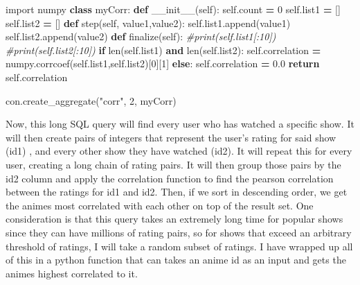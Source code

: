 \documentclass[
]{article}
\newenvironment{Shaded}{\begin{snugshade}}{\end{snugshade}}
\newcommand{\BuiltInTok}[1]{#1}
\newcommand{\CommentTok}[1]{\textcolor[rgb]{0.56,0.35,0.01}{\textit{#1}}}
\newcommand{\ControlFlowTok}[1]{\textcolor[rgb]{0.13,0.29,0.53}{\textbf{#1}}}
\newcommand{\DecValTok}[1]{\textcolor[rgb]{0.00,0.00,0.81}{#1}}
\newcommand{\FloatTok}[1]{\textcolor[rgb]{0.00,0.00,0.81}{#1}}
\newcommand{\FunctionTok}[1]{\textcolor[rgb]{0.00,0.00,0.00}{#1}}
\newcommand{\ImportTok}[1]{#1}
\newcommand{\KeywordTok}[1]{\textcolor[rgb]{0.13,0.29,0.53}{\textbf{#1}}}
\newcommand{\NormalTok}[1]{#1}
\newcommand{\OperatorTok}[1]{\textcolor[rgb]{0.81,0.36,0.00}{\textbf{#1}}}
\newcommand{\StringTok}[1]{\textcolor[rgb]{0.31,0.60,0.02}{#1}}
\newcommand{\VariableTok}[1]{\textcolor[rgb]{0.00,0.00,0.00}{#1}}
\begin{document}
\begin{Shaded}
\begin{Highlighting}[]
\ImportTok{import}\NormalTok{ numpy}
\KeywordTok{class}\NormalTok{ myCorr:}
    \KeywordTok{def} \FunctionTok{\_\_init\_\_}\NormalTok{(}\VariableTok{self}\NormalTok{):}
        \VariableTok{self}\NormalTok{.count }\OperatorTok{=} \DecValTok{0}
        \VariableTok{self}\NormalTok{.list1 }\OperatorTok{=}\NormalTok{ []}
        \VariableTok{self}\NormalTok{.list2 }\OperatorTok{=}\NormalTok{ []}
    \KeywordTok{def}\NormalTok{ step(}\VariableTok{self}\NormalTok{, value1,value2):}
        \VariableTok{self}\NormalTok{.list1.append(value1)}
        \VariableTok{self}\NormalTok{.list2.append(value2)}
    \KeywordTok{def}\NormalTok{ finalize(}\VariableTok{self}\NormalTok{):}
        \CommentTok{\#print(self.list1[:10])}
        \CommentTok{\#print(self.list2[:10])}
        \ControlFlowTok{if} \BuiltInTok{len}\NormalTok{(}\VariableTok{self}\NormalTok{.list1) }\KeywordTok{and} \BuiltInTok{len}\NormalTok{(}\VariableTok{self}\NormalTok{.list2):}
            \VariableTok{self}\NormalTok{.correlation }\OperatorTok{=}\NormalTok{ numpy.corrcoef(}\VariableTok{self}\NormalTok{.list1,}\VariableTok{self}\NormalTok{.list2)[}\DecValTok{0}\NormalTok{][}\DecValTok{1}\NormalTok{]}
        \ControlFlowTok{else}\NormalTok{:}
            \VariableTok{self}\NormalTok{.correlation }\OperatorTok{=} \FloatTok{0.0}
        \ControlFlowTok{return} \VariableTok{self}\NormalTok{.correlation}

\NormalTok{con.create\_aggregate(}\StringTok{"corr"}\NormalTok{, }\DecValTok{2}\NormalTok{, myCorr)}
\end{Highlighting}
\end{Shaded}

Now, this long SQL query will find every user who has watched a specific
show. It will then create pairs of integers that represent the user's
rating for said show (id1) , and every other show they have watched
(id2). It will repeat this for every user, creating a long chain of
rating pairs. It will then group those pairs by the id2 column and apply
the correlation function to find the pearson correlation between the
ratings for id1 and id2. Then, if we sort in descending order, we get
the animes most correlated with each other on top of the result set. One
consideration is that this query takes an extremely long time for
popular shows since they can have millions of rating pairs, so for shows
that exceed an arbitrary threshold of ratings, I will take a random
subset of ratings. I have wrapped up all of this in a python function
that can takes an anime id as an input and gets the animes highest
correlated to it.
\end{document}
